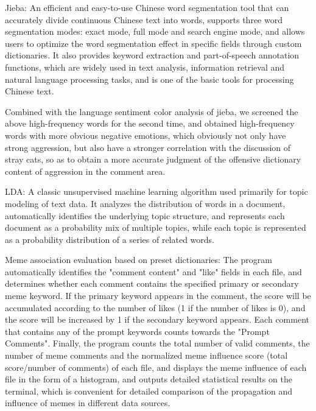 \documentclass[12pt,a4paper]{ctexart}
\theoremstyle{MyLineTheoremStyle}
\theoremstyle{MyBlockTheoremStyle}
\theoremstyle{MySubsubsectionStyle}
\begin{document}
Jieba: An efficient and easy-to-use Chinese word segmentation tool that can accurately divide continuous Chinese text into words, supports three word segmentation modes: exact mode, full mode and search engine mode, and allows users to optimize the word segmentation effect in specific fields through custom dictionaries. It also provides keyword extraction and part-of-speech annotation functions, which are widely used in text analysis, information retrieval and natural language processing tasks, and is one of the basic tools for processing Chinese text.

Combined with the language sentiment color analysis of jieba, we screened the above high-frequency words for the second time, and obtained high-frequency words with more obvious negative emotions, which obviously not only have strong aggression, but also have a stronger correlation with the discussion of stray cats, so as to obtain a more accurate judgment of the offensive dictionary content of aggression in the comment area.

LDA: A classic unsupervised machine learning algorithm used primarily for topic modeling of text data. It analyzes the distribution of words in a document, automatically identifies the underlying topic structure, and represents each document as a probability mix of multiple topics, while each topic is represented as a probability distribution of a series of related words.

Meme association evaluation based on preset dictionaries: The program automatically identifies the "comment content" and "like" fields in each file, and determines whether each comment contains the specified primary or secondary meme keyword. If the primary keyword appears in the comment, the score will be accumulated according to the number of likes (1 if the number of likes is 0), and the score will be increased by 1 if the secondary keyword appears. Each comment that contains any of the prompt keywords counts towards the "Prompt Comments". Finally, the program counts the total number of valid comments, the number of meme comments and the normalized meme influence score (total score/number of comments) of each file, and displays the meme influence of each file in the form of a histogram, and outputs detailed statistical results on the terminal, which is convenient for detailed comparison of the propagation and influence of memes in different data sources.
\end{document}
